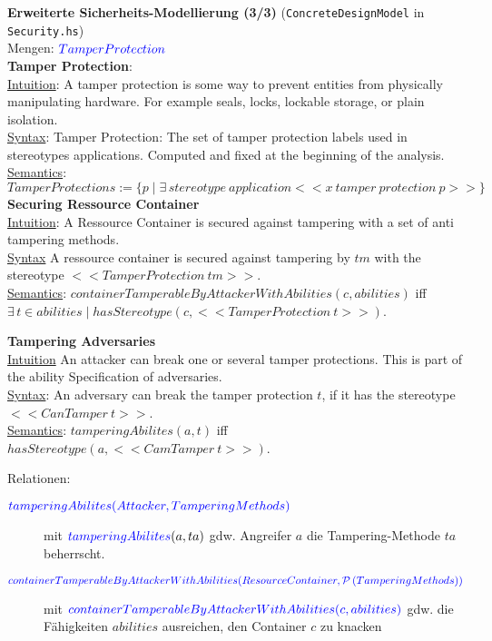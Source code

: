 \textbf{Erweiterte Sicherheits-Modellierung (3/3)} (\texttt{ConcreteDesignModel} in \texttt{Security.hs})\\

Mengen: ${\color{blue}{TamperProtection}}$ \\

\textbf{Tamper Protection}: \\
\underline{Intuition}: A tamper protection is some way to prevent entities from physically manipulating hardware.
For example seals, locks, lockable storage, or plain isolation. \\
\underline{Syntax}: Tamper Protection: The set of tamper protection labels used in stereotypes applications. Computed and fixed at the beginning of the analysis. %
\underline{Semantics}: $TamperProtections := \{p \mid \exists \, stereotype~application <<x~tamper~protection~p>>\}$\\%

\textbf{Securing Ressource Container} \\
\underline{Intuition}: A Ressource Container is secured against tampering with a set of anti tampering methods.\\
\underline{Syntax} A ressource container is secured against tampering by $tm$ with the stereotype $<<TamperProtection~tm>>$.\\
\underline{Semantics}: $containerTamperableByAttackerWithAbilities(c, abilities)$ iff $\exists \, t \in abilities \mid hasStereotype(c, <<TamperProtection~t>>)$. %

\textbf{Tampering Adversaries}\\
\underline{Intuition} An attacker can break one or several tamper protections.
This is part of the ability Specification of adversaries.\\
\underline{Syntax}: An adversary can break the tamper protection $t$, if it has the stereotype $<<CanTamper~t>>$.\\
\underline{Semantics}: $tamperingAbilites(a,t)$ iff $hasStereotype(a,<<CamTamper~t>>)$.


Relationen:
\begin{description}
  \item[${\color{blue}{tamperingAbilites(Attacker, TamperingMethods)}}$]
        mit ${\color{blue}{tamperingAbilites}}(a, ta)$ gdw. Angreifer $a$ die
        Tampering-Methode $ta$ beherrscht.

  \item[${\color{blue}{containerTamperableByAttackerWithAbilities(ResourceContainer,
        \mathcal{P}\left(TamperingMethods\right))}}$]
        mit ${\color{blue}{containerTamperableByAttackerWithAbilities(c, abilities)}}$ gdw. die Fähigkeiten $abilities$ ausreichen, den Container $c$ zu knacken
\end{description} 
